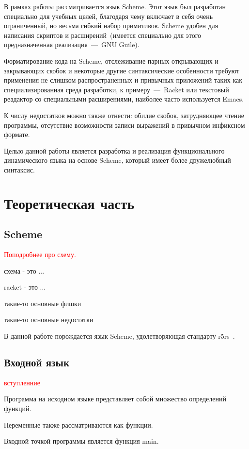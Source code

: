\documentclass[12pt,a4paper,oneside]{extarticle}
\begin{document}
    В рамках работы рассматривается язык Scheme.
    Этот язык был разработан специально для учебных целей, благодаря чему включает в себя очень ограниченный, но весьма гибкий набор примитивов.
    Scheme удобен для написания скриптов и расширений~(имеется специально для этого предназначенная реализация~---~GNU Guile).

    Форматирование кода на Scheme, отслеживание парных открывающих и закрывающих скобок и некоторые другие синтаксические особенности требуют применения не слишком распространенных и привычных приложений таких как специализированная среда разработки, к примеру~---~Racket или текстовый реадактор со специальными расширениями, наиболее часто используется Emacs. 

    К числу недостатков можно также отнести: обилие скобок, затрудняющее чтение программы, отсутствие возможности записи выражений в привычном инфиксном формате.
    
    Целью данной работы является разработка и реализация функционального динамического языка на основе Scheme, который имеет более дружелюбный синтаксис.
\clearpage

\section{Теоретическая часть}
    \subsection{Scheme}
        \textcolor{red}{Поподробнее про схему.}

        схема - это ...

        racket - это ...

        такие-то основные фишки

        такие-то основные недостатки

        В данной работе порождается язык Scheme, удолетворяющая стандарту r5rs~\cite{r5rs}.
    \subsection{Входной язык}
        \textcolor{red}{вступленние}

        Программа на исходном языке представляет собой множество определений функций.

        Переменные также рассматриваются как функции.

        Входной точкой программы является функция main.
\end{document}
